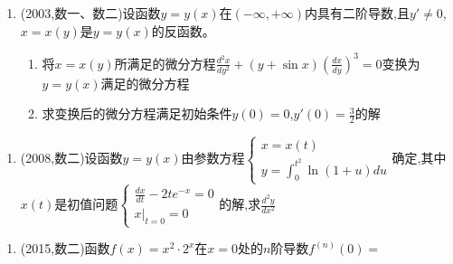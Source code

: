 \documentclass[12pt, a4paper, oneside, UTF8]{ctexbook}
\begin{document}
\begin{enumerate}[label=\arabic*.,start=7]
    \item (2003,数一、数二)设函数$y=y(x)$在$(-\infty,+\infty)$内具有二阶导数,且$y'\neq0$,$x=x(y)$是$y=y(x)$的反函数。
    \begin{enumerate}[label=(\roman*)]
        \item 将$x=x(y)$所满足的微分方程$\frac{d^2x}{dy^2}+(y+\sin x)\left(\frac{dx}{dy}\right)^3=0$变换为$y=y(x)$满足的微分方程
        \item 求变换后的微分方程满足初始条件$y(0)=0$,$y'(0)=\frac{3}{2}$的解
    \end{enumerate}
    
    \begin{solution}
    \newpage
    \end{solution}
\end{enumerate}

\begin{remark}
\end{remark}

\begin{enumerate}[label=\arabic*.,start=8]
    \item (2008,数二)设函数$y=y(x)$由参数方程$\begin{cases}
        x=x(t) \\
        y=\int_0^{t^2}\ln(1+u)du
    \end{cases}$确定,其中$x(t)$是初值问题$\begin{cases}
        \frac{dx}{dt}-2te^{-x}=0 \\
        x|_{t=0}=0
    \end{cases}$的解,求$\frac{d^2y}{dx^2}$
    
    \begin{solution}
    \newpage
    \end{solution}
\end{enumerate}

\begin{remark}
\end{remark}

\begin{enumerate}[label=\arabic*.,start=9]
    \item (2015,数二)函数$f(x)=x^2\cdot2^x$在$x=0$处的$n$阶导数$f^{(n)}(0)=$\underline{\quad}
    
    \begin{solution}
    \newpage
    \end{solution}
\end{enumerate}
\end{document}

